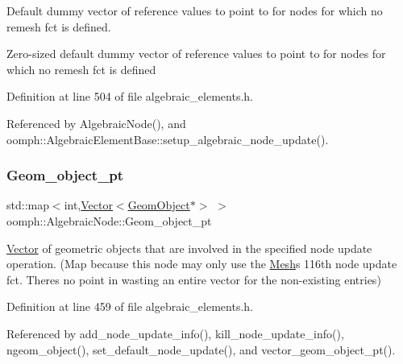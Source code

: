 Default dummy vector of reference values to point to for nodes for which no remesh fct is defined. 

Zero-\/sized default dummy vector of reference values to point to for nodes for which no remesh fct is defined 

Definition at line 504 of file algebraic\+\_\+elements.\+h.



Referenced by Algebraic\+Node(), and oomph\+::\+Algebraic\+Element\+Base\+::setup\+\_\+algebraic\+\_\+node\+\_\+update().

\mbox{\label{classoomph_1_1AlgebraicNode_a1e378862db7979494c3d224df3f98b2b}} 
\subsubsection{\texorpdfstring{Geom\+\_\+object\+\_\+pt}{Geom\_object\_pt}}
{\footnotesize\ttfamily std\+::map$<$int,\hyperlink{classoomph_1_1Vector}{Vector}$<$\hyperlink{classoomph_1_1GeomObject}{Geom\+Object}$\ast$$>$ $>$ oomph\+::\+Algebraic\+Node\+::\+Geom\+\_\+object\+\_\+pt\hspace{0.3cm}{\ttfamily [private]}}



\hyperlink{classoomph_1_1Vector}{Vector} of geometric objects that are involved in the specified node update operation. (Map because this node may only use the \hyperlink{classoomph_1_1Mesh}{Mesh}\textquotesingle{}s 116th node update fct. There\textquotesingle{}s no point in wasting an entire vector for the non-\/existing entries) 



Definition at line 459 of file algebraic\+\_\+elements.\+h.



Referenced by add\+\_\+node\+\_\+update\+\_\+info(), kill\+\_\+node\+\_\+update\+\_\+info(), ngeom\+\_\+object(), set\+\_\+default\+\_\+node\+\_\+update(), and vector\+\_\+geom\+\_\+object\+\_\+pt().

\mbox{\label{classoomph_1_1AlgebraicNode_a5696d589c11a229f402d68476c7fe435}} 
